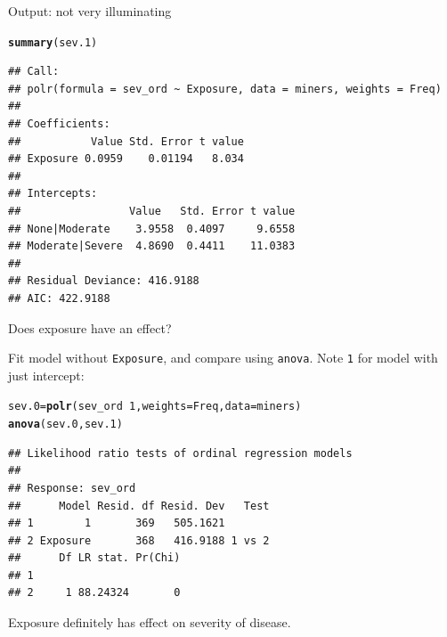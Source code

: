 \documentclass[unknownkeysallowed]{beamer}\usepackage[]{graphicx}\usepackage[]{color}
\makeatletter
\newcommand{\hlnum}[1]{\textcolor[rgb]{0.686,0.059,0.569}{#1}}%
\newcommand{\hlopt}[1]{\textcolor[rgb]{0,0,0}{#1}}%
\newcommand{\hlstd}[1]{\textcolor[rgb]{0.345,0.345,0.345}{#1}}%
\newcommand{\hlkwb}[1]{\textcolor[rgb]{0.69,0.353,0.396}{#1}}%
\newcommand{\hlkwc}[1]{\textcolor[rgb]{0.333,0.667,0.333}{#1}}%
\newcommand{\hlkwd}[1]{\textcolor[rgb]{0.737,0.353,0.396}{\textbf{#1}}}%
\newenvironment{kframe}{%
 \def\at@end@of@kframe{}%
 \ifinner\ifhmode%
  \def\at@end@of@kframe{\end{minipage}}%
  \begin{minipage}{\columnwidth}%
 \fi\fi%
 \def\FrameCommand##1{\hskip\@totalleftmargin \hskip-\fboxsep
 \colorbox{shadecolor}{##1}\hskip-\fboxsep
     \hskip-\linewidth \hskip-\@totalleftmargin \hskip\columnwidth}%
 \MakeFramed {\advance\hsize-\width
   \@totalleftmargin\z@ \linewidth\hsize
   \@setminipage}}%
 {\par\unskip\endMakeFramed%
 \at@end@of@kframe}
\newenvironment{knitrout}{}{} %
\makeatother
\begin{document}
\begin{frame}[fragile]{Output: not very illuminating}
  
\begin{knitrout}\small
{}\color{fgcolor}\begin{kframe}
\begin{alltt}
\hlkwd{summary}\hlstd{(sev.1)}
\end{alltt}


{\ttfamily\noindent\itshape\color{messagecolor}{\#\# \\\#\# Re-fitting to get Hessian}}\begin{verbatim}
## Call:
## polr(formula = sev_ord ~ Exposure, data = miners, weights = Freq)
## 
## Coefficients:
##           Value Std. Error t value
## Exposure 0.0959    0.01194   8.034
## 
## Intercepts:
##                 Value   Std. Error t value
## None|Moderate    3.9558  0.4097     9.6558
## Moderate|Severe  4.8690  0.4411    11.0383
## 
## Residual Deviance: 416.9188 
## AIC: 422.9188
\end{verbatim}
\end{kframe}
\end{knitrout}
  
\end{frame}
 
\begin{frame}[fragile]{Does exposure have an effect?}
  
  Fit model without \texttt{Exposure}, and compare
using \texttt{anova}. Note \texttt{1} for model with just intercept:



\begin{knitrout}\footnotesize
{}\color{fgcolor}\begin{kframe}
\begin{alltt}
\hlstd{sev.0}\hlkwb{=}\hlkwd{polr}\hlstd{(sev_ord}\hlopt{~}\hlnum{1}\hlstd{,}\hlkwc{weights}\hlstd{=Freq,}\hlkwc{data}\hlstd{=miners)}
\hlkwd{anova}\hlstd{(sev.0,sev.1)}
\end{alltt}
\begin{verbatim}
## Likelihood ratio tests of ordinal regression models
## 
## Response: sev_ord
##      Model Resid. df Resid. Dev   Test
## 1        1       369   505.1621       
## 2 Exposure       368   416.9188 1 vs 2
##      Df LR stat. Pr(Chi)
## 1                       
## 2     1 88.24324       0
\end{verbatim}
\end{kframe}
\end{knitrout}


Exposure definitely has effect on severity of disease. 

  
\end{frame}
\end{document}
